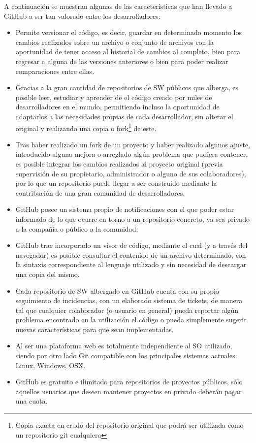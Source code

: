 A continuación se muestran algunas de las características que han llevado a GitHub a ser tan valorado entre los desarrolladores\cite{quintana2015}:

\begin{itemize}
	\item Permite versionar el código, es decir, guardar en determinado momento los cambios realizados sobre un archivo o conjunto de archivos con la oportunidad de tener acceso al historial de cambios al completo, bien para regresar a alguna de las versiones anteriores o bien para poder realizar comparaciones entre ellas.
	\item Gracias a la gran cantidad de repositorios de \gls{SW} públicos que alberga, es posible leer, estudiar y aprender de el código creado por miles de desarrolladores en el mundo, permitiendo incluso la oportunidad de adaptarlos a las necesidades propias de cada desarrollador, sin alterar el original y realizando una copia o fork\footnote{Copia exacta en crudo del repositorio original que podrá ser utilizada como un repositorio git cualquiera} de este.
	\item Tras haber realizado un fork de un proyecto y haber realizado algunos ajuste, introducido alguna mejora o arreglado algún problema que pudiera contener, es posible integrar los cambios realizados al proyecto original (previa supervisión de su propietario, administrador o alguno de sus colaboradores), por lo que un repositorio puede llegar a ser construido mediante la contribución de una gran comunidad de desarrolladores.
	\item GitHub posee un sistema propio de notificaciones con el que poder estar informado de lo que ocurre en torno a un repositorio concreto, ya sea privado a la compañía o público a la comunidad.
	\item GitHub trae incorporado un visor de código, mediante el cual (y a través del navegador) es posible consultar el contenido de un archivo determinado, con la sintaxis correspondiente al lenguaje utilizado y sin necesidad de descargar una copia del mismo.
	\item Cada repositorio de \gls{SW} albergado en GitHub cuenta con su propio seguimiento de incidencias, con un elaborado sistema de tickets, de manera tal que cualquier colaborador (o usuario en general) pueda reportar algún problema encontrado en la utilización el código o pueda simplemente sugerir nuevas características para que sean implementadas.
	\item Al ser una plataforma web es totalmente independiente al \gls{SO} utilizado, siendo por otro lado Git compatible con los principales sistemas actuales: Linux, Windows, OSX.
	\item GitHub es gratuito e ilimitado para repositorios de proyectos públicos, sólo aquellos usuarios que deseen mantener proyectos en privado deberán pagar una cuota. 
\end{itemize}

